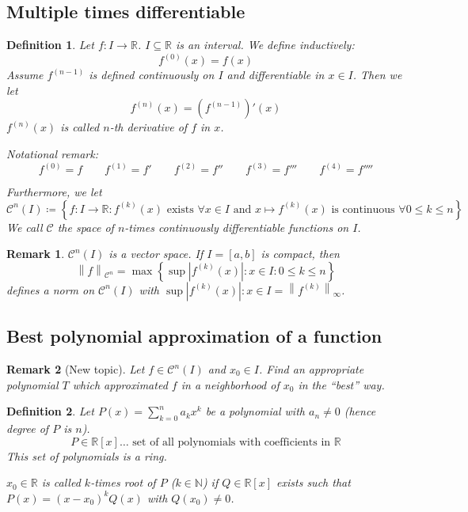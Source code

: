 \documentclass{article}
\newtheorem{definition}{Definition}  \numberwithin{definition}{section}
\newtheorem{remark}{Remark}  \numberwithin{remark}{section}
\newcommand{\set}[1]{\left\{#1\right\}}
\newcommand{\norm}[1]{\left\|#1\right\|}
\newcommand{\card}[1]{\left|#1\right|}
\begin{document}
\subsection{Multiple times differentiable}

\begin{definition} %
  Let $f: I \to \mathbb R$. $I \subseteq \mathbb R$ is an interval.
  We define inductively:
  \[ f^{(0)}(x) = f(x) \]
  Assume $f^{(n-1)}$ is defined continuously on $I$ and differentiable in $x \in I$.
  Then we let
  \[ f^{(n)}(x) = \left(f^{(n-1)}\right)'(x) \]
  $f^{(n)}(x)$ is called $n$-th derivative of $f$ in $x$.
  
  Notational remark:
  \[ f^{(0)} = f \qquad f^{(1)} = f' \qquad f^{(2)} = f'' \qquad f^{(3)} = f''' \qquad f^{(4)} = f'''' \]

  Furthermore, we let
  \[ \mathcal C^n(I) \coloneqq \set{f: I \to \mathbb R: f^{(k)}(x) \text{ exists } \forall x \in I \text{ and } x \mapsto f^{(k)}(x) \text{ is continuous } \forall 0 \leq k \leq n} \]
  We call $\mathcal C$ the space of $n$-times continuously differentiable functions on $I$.
\end{definition}

\begin{remark}
  $\mathcal C^n(I)$ is a vector space.
  If $I = [a,b]$ is compact, then
  \[ \norm{f}_{\mathcal C^n} = \max\set{\sup{\card{f^{(k)}(x)}: x \in I}: 0 \leq k \leq n} \]
  defines a norm on $\mathcal C^n(I)$ with $\sup{\card{f^{(k)}(x)}: x \in I} = {\norm{f^{(k)}}_{\infty}}$.
\end{remark}

\subsection{Best polynomial approximation of a function}

\begin{remark}[New topic]
  Let $f \in \mathcal C^n(I)$ and $x_0 \in I$. Find an appropriate polynomial $T$ which approximated $f$ in a neighborhood of $x_0$ in the \enquote{best} way.
\end{remark}

\begin{definition} %
  Let $P(x) = \sum_{k=0}^n a_k x^k$ be a polynomial with $a_n \neq 0$
  (hence degree of $P$ is $n$).
  \[ P \in \mathbb R[x] \dots \text{ set of all polynomials with coefficients in } \mathbb R \]
  This set of polynomials is a ring.

  $x_0 \in \mathbb R$ is called $k$-times root of $P$ ($k \in \mathbb N$) if $Q \in \mathbb R[x]$ exists such that
  $P(x) = (x - x_0)^k Q(x)$ with $Q(x_0) \neq 0$.
\end{definition}
\end{document}
